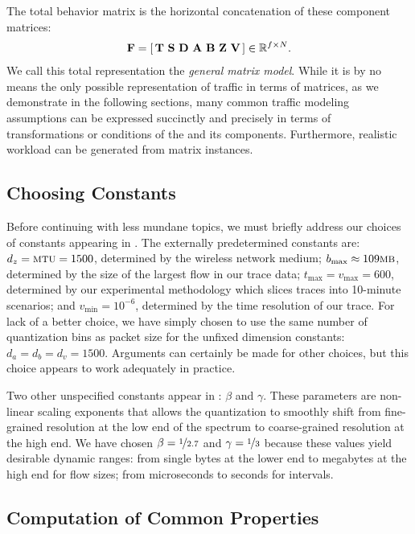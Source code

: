 \documentclass[twocolumn,final]{svjour3}
\begin{document}
The total behavior matrix is the horizontal concatenation of these component matrices:
\begin{align}
\mathbf{F} = \left[\,\mathbf{T}~\mathbf{S}~\mathbf{D}~\mathbf{A}~\mathbf{B}~\mathbf{Z}~\mathbf{V}\,\right] \in \mathbb{R}^{f \times N}.
\end{align}
We call this total representation the \emph{general matrix model}.
While it is by no means the only possible representation of traffic in terms of matrices, as we demonstrate in the following sections, many common traffic modeling assumptions can be expressed succinctly and precisely in terms of transformations or conditions of the  and its components.
Furthermore, realistic workload can be generated from matrix instances.

\subsection{Choosing Constants}

Before continuing with less mundane topics, we must briefly address our choices of constants appearing in .
The externally predetermined constants are:
$d_z=\text{\caps{MTU}}=1500$, determined by the wireless network medium;
$b_{\max} \approx 109 \text{\caps{MB}}$, determined by the size of the largest flow in our trace data;
$t_{\max}=v_{\max}=600$, determined by our experimental methodology which slices traces into 10-minute scenarios;
and $v_{\min}=10^{-6}$, determined by the time resolution of our trace.
For lack of a better choice, we have simply chosen to use the same number of quantization bins as packet size for the unfixed dimension constants:
$d_a = d_b = d_v = 1500$.
Arguments can certainly be made for other choices, but this choice appears to work adequately in practice.

Two other unspecified constants appear in : $\beta$ and $\gamma$.
These parameters are non-linear scaling exponents that allows the quantization to smoothly shift from fine-grained resolution at the low end of the spectrum to coarse-grained resolution at the high end.
We have chosen $\beta=\nicefrac{1}{2.7}$ and $\gamma=\nicefrac{1}{3}$ because these values yield desirable dynamic ranges: from single bytes at the lower end to megabytes at the high end for flow sizes; from microseconds to seconds for intervals.

\subsection{Computation of Common Properties}
\label{sec:common-properties}
\end{document}
